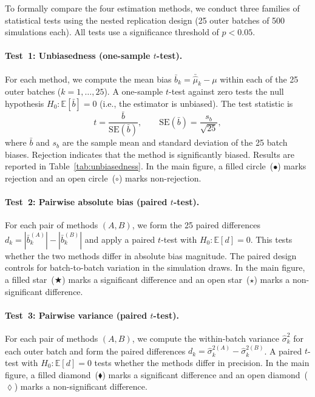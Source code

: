 \documentclass[11pt]{article}
\begin{document}
To formally compare the four estimation methods, we conduct three families of statistical tests using the nested replication design (25 outer batches of 500 simulations each). All tests use a significance threshold of $p < 0.05$.

\paragraph{Test~1: Unbiasedness (one-sample $t$-test).}
For each method, we compute the mean bias $\bar{b}_k = \bar{\hat{\mu}}_k - \mu$ within each of the 25 outer batches ($k = 1, \dots, 25$). A one-sample $t$-test against zero tests the null hypothesis $H_0\colon \mathbb{E}[\bar{b}] = 0$ (i.e., the estimator is unbiased). The test statistic is
\[
t = \frac{\bar{b}}{\mathrm{SE}(\bar{b})}, \qquad \mathrm{SE}(\bar{b}) = \frac{s_b}{\sqrt{25}},
\]
where $\bar{b}$ and $s_b$ are the sample mean and standard deviation of the 25 batch biases. Rejection indicates that the method is significantly biased. Results are reported in Table~\ref{tab:unbiasedness}. In the main figure, a filled circle~($\bullet$) marks rejection and an open circle~($\circ$) marks non-rejection.

\paragraph{Test~2: Pairwise absolute bias (paired $t$-test).}
For each pair of methods $(A, B)$, we form the 25 paired differences $d_k = |\bar{b}_k^{(A)}| - |\bar{b}_k^{(B)}|$ and apply a paired $t$-test with $H_0\colon \mathbb{E}[d] = 0$. This tests whether the two methods differ in absolute bias magnitude. The paired design controls for batch-to-batch variation in the simulation draws. In the main figure, a filled star~($\bigstar$) marks a significant difference and an open star~($\star$) marks a non-significant difference.

\paragraph{Test~3: Pairwise variance (paired $t$-test).}
For each pair of methods $(A, B)$, we compute the within-batch variance $\hat{\sigma}^2_k$ for each outer batch and form the paired differences $d_k = \hat{\sigma}^{2(A)}_k - \hat{\sigma}^{2(B)}_k$. A paired $t$-test with $H_0\colon \mathbb{E}[d] = 0$ tests whether the methods differ in precision. In the main figure, a filled diamond~($\blacklozenge$) marks a significant difference and an open diamond~($\lozenge$) marks a non-significant difference.
\end{document}

